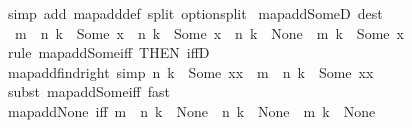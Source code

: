 \begin{isabellebody}
%
\isadelimproof
%
\endisadelimproof
%
\isatagproof
{}\isamarkupfalse%
\ {\isacharparenleft}{\kern0pt}simp\ add{\isacharcolon}{\kern0pt}\ map{\isacharunderscore}{\kern0pt}add{\isacharunderscore}{\kern0pt}def\ split{\isacharcolon}{\kern0pt}\ option{\isachardot}{\kern0pt}split{\isacharparenright}{\kern0pt}%
\endisatagproof
{\isafoldproof}%
%
\isadelimproof
\isanewline
%
\endisadelimproof
\isanewline
{}\isamarkupfalse%
\ map{\isacharunderscore}{\kern0pt}add{\isacharunderscore}{\kern0pt}SomeD\ {\isacharbrackleft}{\kern0pt}dest{\isacharbang}{\kern0pt}{\isacharbrackright}{\kern0pt}{\isacharcolon}{\kern0pt}\isanewline
\ \ {\isachardoublequoteopen}{\isacharparenleft}{\kern0pt}m\ {\isacharplus}{\kern0pt}{\isacharplus}{\kern0pt}\ n{\isacharparenright}{\kern0pt}\ k\ {\isacharequal}{\kern0pt}\ Some\ x\ {\isasymLongrightarrow}\ n\ k\ {\isacharequal}{\kern0pt}\ Some\ x\ {\isasymor}\ n\ k\ {\isacharequal}{\kern0pt}\ None\ {\isasymand}\ m\ k\ {\isacharequal}{\kern0pt}\ Some\ x{\isachardoublequoteclose}\isanewline
%
\isadelimproof
%
\endisadelimproof
%
\isatagproof
{}\isamarkupfalse%
\ {\isacharparenleft}{\kern0pt}rule\ map{\isacharunderscore}{\kern0pt}add{\isacharunderscore}{\kern0pt}Some{\isacharunderscore}{\kern0pt}iff\ {\isacharbrackleft}{\kern0pt}THEN\ iffD{}{\isacharbrackright}{\kern0pt}{\isacharparenright}{\kern0pt}%
\endisatagproof
{\isafoldproof}%
%
\isadelimproof
\isanewline
%
\endisadelimproof
\isanewline
{}\isamarkupfalse%
\ map{\isacharunderscore}{\kern0pt}add{\isacharunderscore}{\kern0pt}find{\isacharunderscore}{\kern0pt}right\ {\isacharbrackleft}{\kern0pt}simp{\isacharbrackright}{\kern0pt}{\isacharcolon}{\kern0pt}\ {\isachardoublequoteopen}n\ k\ {\isacharequal}{\kern0pt}\ Some\ xx\ {\isasymLongrightarrow}\ {\isacharparenleft}{\kern0pt}m\ {\isacharplus}{\kern0pt}{\isacharplus}{\kern0pt}\ n{\isacharparenright}{\kern0pt}\ k\ {\isacharequal}{\kern0pt}\ Some\ xx{\isachardoublequoteclose}\isanewline
%
\isadelimproof
%
\endisadelimproof
%
\isatagproof
{}\isamarkupfalse%
\ {\isacharparenleft}{\kern0pt}subst\ map{\isacharunderscore}{\kern0pt}add{\isacharunderscore}{\kern0pt}Some{\isacharunderscore}{\kern0pt}iff{\isacharparenright}{\kern0pt}\ fast%
\endisatagproof
{\isafoldproof}%
%
\isadelimproof
\isanewline
%
\endisadelimproof
\isanewline
{}\isamarkupfalse%
\ map{\isacharunderscore}{\kern0pt}add{\isacharunderscore}{\kern0pt}None\ {\isacharbrackleft}{\kern0pt}iff{\isacharbrackright}{\kern0pt}{\isacharcolon}{\kern0pt}\ {\isachardoublequoteopen}{\isacharparenleft}{\kern0pt}{\isacharparenleft}{\kern0pt}m\ {\isacharplus}{\kern0pt}{\isacharplus}{\kern0pt}\ n{\isacharparenright}{\kern0pt}\ k\ {\isacharequal}{\kern0pt}\ None{\isacharparenright}{\kern0pt}\ {\isacharequal}{\kern0pt}\ {\isacharparenleft}{\kern0pt}n\ k\ {\isacharequal}{\kern0pt}\ None\ {\isasymand}\ m\ k\ {\isacharequal}{\kern0pt}\ None{\isacharparenright}{\kern0pt}{\isachardoublequoteclose}\isanewline

\end{isabellebody}
